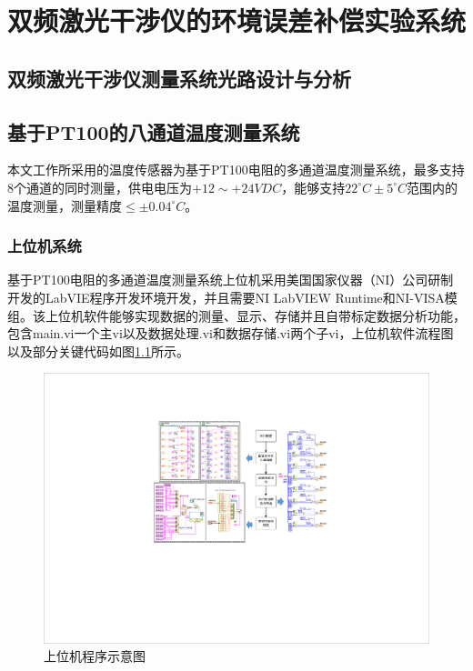 \chapter{双频激光干涉仪的环境误差补偿实验系统}
\section{双频激光干涉仪测量系统光路设计与分析}
\section{基于PT100的八通道温度测量系统}
本文工作所采用的温度传感器为基于PT100电阻的多通道温度测量系统，最多支持8个通道的同时测量，供电电压为\(+12 \sim +24VDC\)，能够支持\(22^{\circ}C \pm 5^{\circ}C\)范围内的温度测量，测量精度\(\leq \pm 0.04^{\circ}C\)。
\subsection{上位机系统}
基于PT100电阻的多通道温度测量系统上位机采用美国国家仪器（NI）公司研制开发的LabVIE程序开发环境开发，并且需要NI LabVIEW Runtime和NI-VISA模组。该上位机软件能够实现数据的测量、显示、存储并且自带标定数据分析功能，包含main.vi一个主vi以及数据处理.vi和数据存储.vi两个子vi，上位机软件流程图以及部分关键代码如图\ref{fig:上位机程序示意图}所示。
\begin{figure}[htb]
    \centering
    \includegraphics[width=14cm]{fig/3-fig/上位机程序示意图.pdf}
    \caption{上位机程序示意图}
    \label{fig:上位机程序示意图}
\end{figure}

